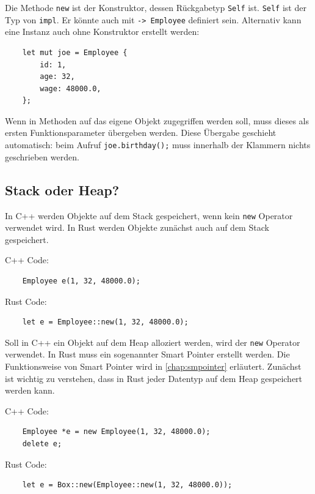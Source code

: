 Die Methode \verb"new" ist der Konstruktor, dessen Rückgabetyp \verb"Self" ist. \verb"Self" ist der Typ von \verb"impl". Er könnte auch mit \verb"-> Employee" definiert sein. Alternativ kann eine Instanz auch ohne Konstruktor erstellt werden:

\begin{lstlisting}
    let mut joe = Employee {
        id: 1,
        age: 32,
        wage: 48000.0,
    };
\end{lstlisting}

Wenn in Methoden auf das eigene Objekt zugegriffen werden soll, muss dieses als ersten Funktionsparameter übergeben werden. Diese Übergabe geschieht automatisch: beim Aufruf \verb"joe.birthday();" muss innerhalb der Klammern nichts geschrieben werden.

\subsection{Stack oder Heap?}

In C++ werden Objekte auf dem Stack gespeichert, wenn kein \verb"new" Operator verwendet wird. In Rust werden Objekte zunächst auch auf dem Stack gespeichert.

C++ Code:

\begin{lstlisting}
    Employee e(1, 32, 48000.0);
\end{lstlisting}

Rust Code:

\begin{lstlisting}
    let e = Employee::new(1, 32, 48000.0);
\end{lstlisting}

Soll in C++ ein Objekt auf dem Heap alloziert werden, wird der \verb"new" Operator verwendet. In Rust muss ein sogenannter Smart Pointer erstellt werden. Die Funktionsweise von Smart Pointer wird in \autoref{chap:smpointer} erläutert. Zunächst ist wichtig zu verstehen, dass in Rust jeder Datentyp auf dem Heap gespeichert werden kann.

C++ Code:

\begin{lstlisting}
    Employee *e = new Employee(1, 32, 48000.0);
    delete e;
\end{lstlisting}

Rust Code:

\begin{lstlisting}
    let e = Box::new(Employee::new(1, 32, 48000.0));
\end{lstlisting}

